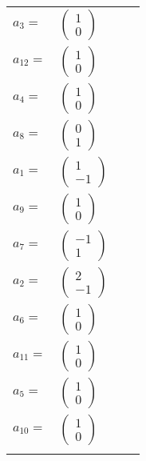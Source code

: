 \documentclass[1p]{elsarticle_modified}
\theoremstyle{definition}
\begin{document}
\begin{tabular}{m{7pt} m{180pt} m{7pt} m{180pt} }
\flushright $a_{3}=$&$\begin{pmatrix}1\\0\end{pmatrix}$ \\
\flushright $a_{12}=$&$\begin{pmatrix}1\\0\end{pmatrix}$ \\
\flushright $a_{4}=$&$\begin{pmatrix}1\\0\end{pmatrix}$ \\
\flushright $a_{8}=$&$\begin{pmatrix}0\\1\end{pmatrix}$ \\
\flushright $a_{1}=$&$\begin{pmatrix}1\\-1\end{pmatrix}$ \\
\flushright $a_{9}=$&$\begin{pmatrix}1\\0\end{pmatrix}$ \\
\flushright $a_{7}=$&$\begin{pmatrix}-1\\1\end{pmatrix}$ \\
\flushright $a_{2}=$&$\begin{pmatrix}2\\-1\end{pmatrix}$ \\
\flushright $a_{6}=$&$\begin{pmatrix}1\\0\end{pmatrix}$ \\
\flushright $a_{11}=$&$\begin{pmatrix}1\\0\end{pmatrix}$ \\
\flushright $a_{5}=$&$\begin{pmatrix}1\\0\end{pmatrix}$ \\
\flushright $a_{10}=$&$\begin{pmatrix}1\\0\end{pmatrix}$\\&\end{tabular}
\end{document}

